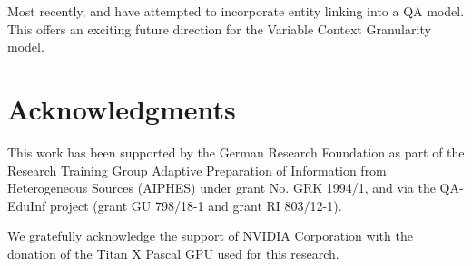 \documentclass[11pt,a4paper]{article}
\begin{document}
Most recently, \citet{Peng2017} and \citet{Yu2017} have attempted to incorporate entity linking into a QA model. This offers an exciting future direction for the Variable Context Granularity model.


\section*{Acknowledgments}
This work has been supported by the German Research Foundation as part of the Research Training Group Adaptive Preparation of Information from Heterogeneous Sources (AIPHES) under grant No. GRK 1994/1, and via the QA-EduInf project (grant GU 798/18-1 and grant RI 803/12-1). 

We gratefully acknowledge the support of NVIDIA Corporation with the donation of the Titan X Pascal GPU used for this research.



\end{document}
